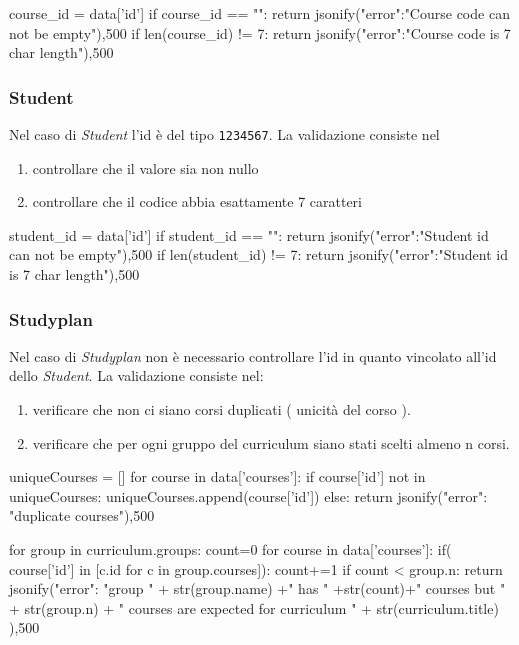 \documentclass{article}
\begin{document}
\begin{python}
course_id = data['id']
if course_id == "":
	return jsonify({"error":"Course code can not be empty"}),500
if len(course_id) != 7:
	return jsonify({"error":"Course code is 7 char length"}),500
\end{python}


\subsubsection{Student}
Nel caso di \emph{Student} l'id è del tipo \texttt{1234567}. La validazione consiste nel
\begin{enumerate}
\item controllare che il valore sia non nullo
\item controllare che il codice abbia esattamente 7 caratteri
\end{enumerate}

\begin{python}
student_id = data['id']
if student_id == "":
	return jsonify({"error":"Student id can not be empty"}),500
if len(student_id) != 7:
	return jsonify({"error":"Student id is 7 char length"}),500
\end{python}

\subsubsection{Studyplan}
Nel caso di \emph{Studyplan} non è necessario controllare l'id in quanto vincolato all'id dello \emph{Student}.
La validazione consiste nel:
\begin{enumerate}
\item verificare che non ci siano corsi duplicati ( unicità del corso ).
\item verificare che per ogni gruppo del curriculum siano stati scelti almeno n corsi.
\end{enumerate}

\begin{python}
 uniqueCourses = []
        for course in data['courses']:
        	if course['id'] not in uniqueCourses:
        		uniqueCourses.append(course['id'])
        	else:
        		return  jsonify({"error": "duplicate courses"}),500

        for group in curriculum.groups:
        	count=0
        	for course in data['courses']:
        		if( course['id'] in [c.id for c in group.courses]):
        			count+=1
        	if count < group.n:
        		return jsonify({"error": "group " + str(group.name) +" has " +str(count)+" courses but " + str(group.n) + " courses are expected for curriculum " +  str(curriculum.title) }),500
\end{python}
\end{document}
